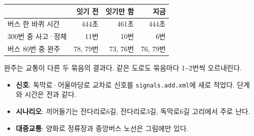 \documentclass[12pt,a4paper]{extarticle}
\newcommand{\head}[1]{\vspace{4pt}{\Large\bfseries\color[HTML]{B3261E}#1}\par\vspace{2pt}}
\begin{document}
{\begin{tabular}{@{}lrrr@{}}
\toprule
 & 잇기 전 & 잇기만 함 & 지금 \\
\midrule
버스 한 바퀴 시간 & 444초 & 461초 & 444초 \\
300번 중 사고·정체 & 11번 & 10번 & 6번 \\
버스 80번 중 완주 & 78, 79번 & 73, 76번 & 76, 79번 \\
\bottomrule
\end{tabular}}

\vspace{3pt}
완주는 교통이 다른 두 묶음의 결과다. 같은 도로도 묶음마다 1\textasciitilde{}2번씩 오르내린다.

\head{팀원별로 볼 것}
\begin{itemize}
\item \textbf{신호}: 독막로·어울마당로 교차로 신호를 \texttt{signals.add.xml}에 새로 적었다. 단계와 시간은 전과 같다.
\item \textbf{시나리오}: 끼어들기는 잔다리로6길, 잔다리로3길, 독막로6길 고리에서 주로 난다.
\item \textbf{대중교통}: 양화로 정류장과 중앙버스 노선은 그림에만 있다.
\end{itemize}
\end{document}
